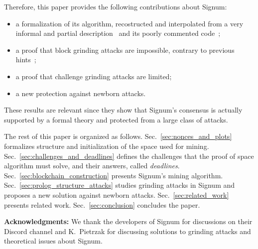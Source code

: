 Therefore, this paper provides the following contributions about Signum:
%
\begin{itemize}
\item a formalization of its algorithm, recostructed and interpolated from a very informal and partial
  description~\cite{SignumPlotting} and its poorly commented code~\cite{SignumSource};
\item a proof that block grinding attacks are impossible, contrary to previous hints~\cite{ParkKFGAP18};
\item a proof that challenge grinding attacks are limited;
\item a new protection against newborn attacks.
\end{itemize}
%
These results are relevant since they show that Signum's consensus
is actually supported by a formal theory and
protected from a large class of attacks.

The rest of this paper is organized as follows.
Sec.~\ref{sec:nonces_and_plots} formalizes structure and initialization of the space used for mining.
Sec.~\ref{sec:challenges_and_deadlines} defines the challenges that the proof of space
algorithm must solve, and their answers, called \emph{deadlines}.
Sec.~\ref{sec:blockchain_construction} presents Signum's mining algorithm.
Sec.~\ref{sec:prolog_structure_attacks} studies grinding attacks
in Signum and proposes a new solution against newborn attacks.
Sec.~\ref{sec:related_work} presents related work.
Sec.~\ref{sec:conclusion} concludes the paper.

\vspace*{1ex}
\textbf{Acknowledgments:}
We thank the developers of Signum for discussions on their Discord channel
and K.\ Pietrzak for discussing solutions to
grinding attacks and theoretical issues about Signum.
